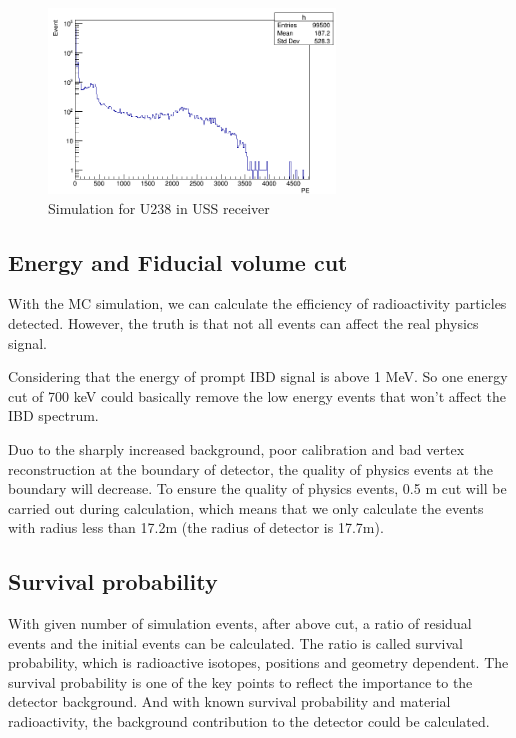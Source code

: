 \documentclass[review,number,sort&compress]{elsarticle}
\begin{document}
\begin{figure}
	\centering
	\includegraphics[width=3in]{U238_USS_receiver.png}
	\caption{Simulation for U238 in USS receiver}
	\label{USS:Rece:U238}
\end{figure}

\subsection{Energy and Fiducial volume cut}


With the MC simulation, we can calculate the efficiency of radioactivity particles detected.
However, the truth is that not all events can affect the real physics signal. 

Considering that the energy of prompt IBD signal is above 1 MeV.
So one energy cut of 700 keV could basically remove 
the low energy events that won't affect the IBD spectrum.

Duo to the sharply increased background, poor calibration and bad vertex reconstruction at the boundary of detector, 
the quality of physics events at the boundary will decrease.
To ensure the quality of physics events, 0.5 m cut will be carried out during calculation, which means that we only calculate the events with radius less than 17.2m (the radius of detector is 17.7m).

\subsection{Survival probability}

With given number of simulation events, after above cut, a ratio of residual events and the initial events can be calculated.
The ratio is called survival probability, which is radioactive isotopes, positions and geometry dependent. 
The survival probability is one of the key points to reflect the importance to the detector background.
And with known survival probability and material radioactivity, the background contribution to the detector could be calculated.
\end{document}
